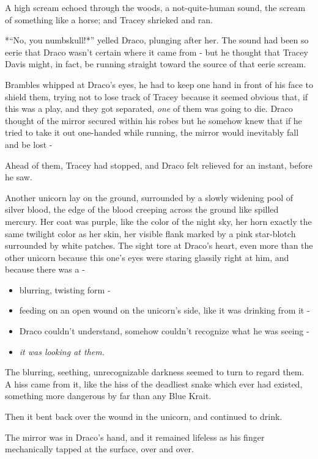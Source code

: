 A high scream echoed through the woods, a not-quite-human sound, the
scream of something like a horse; and Tracey shrieked and ran.

*``No, you numbskull!*'' yelled Draco, plunging after her. The sound had
been so eerie that Draco wasn't certain where it came from - but he
thought that Tracey Davis might, in fact, be running straight toward the
source of that eerie scream.

Brambles whipped at Draco's eyes, he had to keep one hand in front of
his face to shield them, trying not to lose track of Tracey because it
seemed obvious that, if this was a play, and they got separated,
\emph{one} of them was going to die. Draco thought of the mirror secured
within his robes but he somehow knew that if he tried to take it out
one-handed while running, the mirror would inevitably fall and be lost -

Ahead of them, Tracey had stopped, and Draco felt relieved for an
instant, before he saw.

Another unicorn lay on the ground, surrounded by a slowly widening pool
of silver blood, the edge of the blood creeping across the ground like
spilled mercury. Her coat was purple, like the color of the night sky,
her horn exactly the same twilight color as her skin, her visible flank
marked by a pink star-blotch surrounded by white patches. The sight tore
at Draco's heart, even more than the other unicorn because this one's
eyes were staring glassily right at him, and because there was a -

\begin{itemize}
\item
  blurring, twisting form -
\item
  feeding on an open wound on the unicorn's side, like it was drinking
  from it -
\item
  Draco couldn't understand, somehow couldn't recognize what he was
  seeing -
\item
  \emph{it was looking at them.}
\end{itemize}

The blurring, seething, unrecognizable darkness seemed to turn to regard
them. A hiss came from it, like the hiss of the deadliest snake which
ever had existed, something more dangerous by far than any Blue Krait.

Then it bent back over the wound in the unicorn, and continued to drink.

The mirror was in Draco's hand, and it remained lifeless as his finger
mechanically tapped at the surface, over and over.

